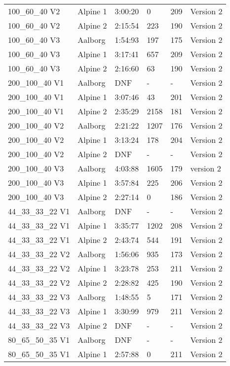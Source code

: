 \documentclass[a4paper,10pt]{scrartcl}
\begin{document}
\begin{table}[H]
\begin{tabular}{llllll}
 100\_60\_40 V2 & Alpine 1 & 3:00:20 & 0 & 209 & Version 2	\\
 100\_60\_40 V2 & Alpine 2 & 2:15:54 & 223 & 190 & Version 2 \\ \hline
 100\_60\_40 V3 & Aalborg & 1:54:93  & 197 & 175 & Version 2   \\ 
 100\_60\_40 V3 & Alpine 1 & 3:17:41  & 657 & 209 & Version 2   \\ 
 100\_60\_40 V3 & Alpine 2 & 2:16:60  & 63 & 190 & Version 2   \\ \hline 
 200\_100\_40 V1 & Aalborg & DNF & - & - & Version 2 \\
 200\_100\_40 V1 & Alpine 1 & 3:07:46 & 43 & 201 & Version 2 \\
 200\_100\_40 V1 & Alpine 2 & 2:35:29 & 2158 & 181 & Version 2 \\ \hline
 200\_100\_40 V2 & Aalborg & 2:21:22 & 1207 & 176 & Version 2 \\
 200\_100\_40 V2 & Alpine 1 & 3:13:24 & 178 & 204 & Version 2 \\
 200\_100\_40 V2 & Alpine 2 & DNF & - & - & Version 2 \\  \hline
 200\_100\_40 V3 & Aalborg & 4:03:88 & 1605 & 179 & version 2 \\
 200\_100\_40 V3 & Alpine 1 & 3:57:84 & 225 & 206 & Version 2 \\
 200\_100\_40 V3 & Alpine 2 & 2:27:14 & 0 & 186 & Version 2 \\ \hline
 44\_33\_33\_22 V1 & Aalborg & DNF & - & - & Version 2 \\
 44\_33\_33\_22 V1 & Alpine 1 & 3:35:77 & 1202 & 208 & Version 2 \\
 44\_33\_33\_22 V1 & Alpine 2 & 2:43:74 & 544 & 191 & Version 2 \\ \hline
 44\_33\_33\_22 V2 & Aalborg & 1:56:06 & 935 & 173 & Version 2 \\
 44\_33\_33\_22 V2 & Alpine 1 & 3:23:78 & 253 & 211 & Version 2 \\
 44\_33\_33\_22 V2 & Alpine 2 & 2:28:82 & 425 & 190 & Version 2 \\ \hline
 44\_33\_33\_22 V3 & Aalborg & 1:48:55 & 5 & 171 & Version 2 \\
 44\_33\_33\_22 V3 & Alpine 1 & 3:30:99 & 979 & 211 & Version 2 \\
 44\_33\_33\_22 V3 & Alpine 2 & DNF & - & - & Version 2 \\ \hline
 80\_65\_50\_35 V1 & Aalborg & DNF & - & - & Version 2 \\
 80\_65\_50\_35 V1 & Alpine 1 & 2:57:88 & 0 & 211 & Version 2 \\

\end{tabular}
\end{table}
\end{document}
